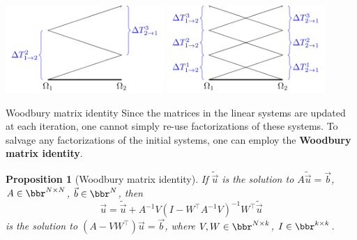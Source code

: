 \documentclass{beamer}
\newtheorem{proposition}{Proposition}
\begin{document}
\begin{frame}
\centering
\includegraphics[width=0.45\textwidth]{AOSM/TIKZ_AOSM_20230614_3.png}
\includegraphics[width=0.45\textwidth]{AOSM/TIKZ_AOSM_20230614_4.png}
\end{frame}

\begin{frame}{Woodbury matrix identity}
Since the matrices in the linear systems are updated at each iteration, one cannot simply re-use factorizations of these systems.
To salvage any factorizations of the initial systems, one can employ the \textbf{Woodbury matrix identity}.

\begin{proposition}[Woodbury matrix identity] \label{prop: woodbury}
If $\tilde{\vec{u}}$ is the solution to $A \tilde{\vec{u}} = \vec{b}$, $A \in \bbr^{N \times N}$, $\vec{b} \in \bbr^N$, then
\begin{equation} \label{eq: woodbury}
	\vec{u} = \tilde{\vec{u}} + A^{-1} V (I - W^\top A^{-1} V)^{-1} W^\top \tilde{\vec{u}}
\end{equation}
is the solution to $(A - V W^\top) \vec{u} = \vec{b}$, where $V, W \in \bbr^{N \times k}$, $I \in \bbr^{k \times k}$.
\end{proposition}
\end{frame}
\end{document}

